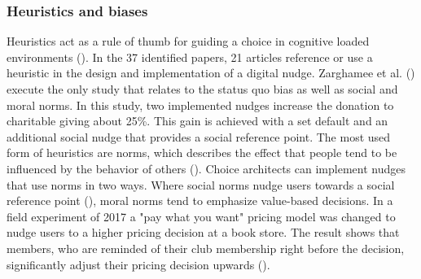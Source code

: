 \subsubsection{Heuristics and biases}
Heuristics act as a rule of thumb for guiding a choice in cognitive loaded environments (\cite{thaler_nudge:_2009}). In the 37 identified papers, 21 articles reference or use a heuristic in the design and implementation of a digital nudge. Zarghamee et al. (\citeyear{zarghamee_nudging_2017}) execute the only study that relates to the status quo bias as well as social and moral norms. In this study, two implemented nudges increase the donation to charitable giving about 25\%. This gain is achieved with a set default and an additional social nudge that provides a social reference point.
The most used form of heuristics are norms, which describes the effect that people tend to be influenced by the behavior of others (\cite{schneider_digital_2018}). Choice architects can implement nudges that use norms in two ways. Where social norms nudge users towards a social reference point (\cite{wang_socially_2018}), moral norms tend to emphasize value-based decisions. In a field experiment of 2017 a "pay what you want" pricing model was changed to nudge users to a higher pricing decision at a book store. The result shows that members, who are reminded of their club membership right before the decision, significantly adjust their pricing decision upwards (\cite{gravert_pride_2017}).


